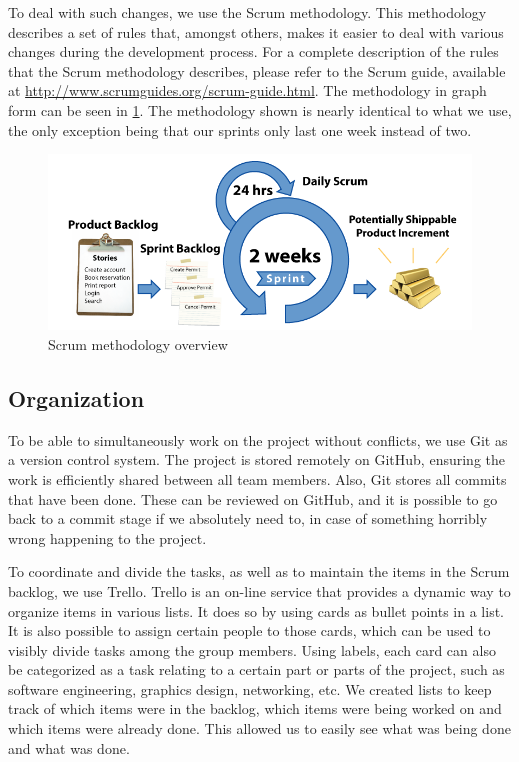 			To deal with such changes, we use the Scrum methodology. This
			methodology describes a set of rules that, amongst others, makes it
			easier to deal with various changes during the development process.
			For a complete description of the rules that the Scrum methodology
			describes, please refer to the Scrum guide, available at
			\url{http://www.scrumguides.org/scrum-guide.html}. The methodology
			in graph form can be seen in \ref{fig:scrum}. The methodology
			shown is nearly identical to what we use, the only 
			exception being that our sprints only last one week instead of two.
			
			\begin{figure}
			\centering
			\includegraphics[width=\textwidth]{Scrum}
			\caption{Scrum methodology overview}
			\label{fig:scrum}
			\end{figure}
		
		\subsection{Organization} \label{ssec:organization}
			To be able to simultaneously work on the project without conflicts, we
			use Git as a version control system. The project is stored remotely on
			GitHub, ensuring the work is efficiently shared between all team members.
			Also, Git stores all commits that have been done. These can be reviewed
			on GitHub, and it is possible to go back to a commit stage if we
			absolutely need to, in case of something horribly wrong happening to
			the project.
			
			To coordinate and divide the tasks, as well as to maintain the items in
			the Scrum backlog, we use Trello. Trello is an on-line service that
			provides a dynamic way to organize items in various lists. It does
			so by using cards as bullet points in a list. It is also possible to
			assign certain people to those cards, which can be used to visibly
			divide tasks among the group members. Using labels, each card can also
			be categorized as a task relating to a certain part or parts of the
			project, such as software engineering, graphics design, networking,
			etc. We created lists to keep track of which items were in the backlog, 
			which items were being worked on and which items were already done.
			This allowed us to easily see what was being done and what was done.
			
